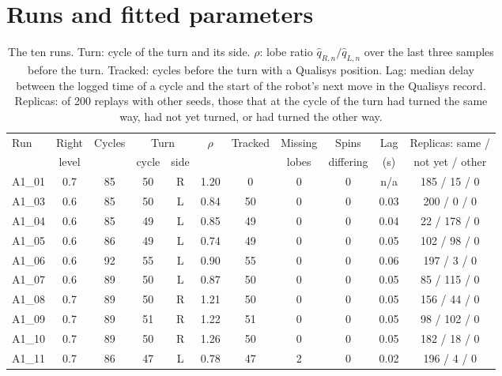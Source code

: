 \documentclass[11pt,a4paper]{article}
\newcommand{\qL}{\hat q_{L,n}}
\newcommand{\qR}{\hat q_{R,n}}
\begin{document}
\appendix
\section{Runs and fitted parameters}

\begin{table}[H]
\centering\small
\caption{The ten runs. Turn: cycle of the turn and its side. $\rho$: lobe ratio $\qR/\qL$ over the last three
samples before the turn. Tracked: cycles before the turn with a Qualisys position. Lag: median delay between
the logged time of a cycle and the start of the robot's next move in the Qualisys record. Replicas: of 200
replays with other seeds, those that at the cycle of the turn had turned the same way, had not yet turned, or
had turned the other way.}
\label{tab:runs}
\setlength{\tabcolsep}{4.2pt}
\begin{tabular}{@{}l c c c c c c c c c c@{}}
\toprule
Run & Right & Cycles & \multicolumn{2}{c}{Turn} & $\rho$ & Tracked & Missing & Spins & Lag & Replicas: same /\\
 & level & & cycle & side & & & lobes & differing & (s) & not yet / other\\
\midrule
A1\_01 & 0.7 & 85 & 50 & R & 1.20 & 0 & 0 & 0 & n/a & 185 / 15 / 0\\
A1\_03 & 0.6 & 85 & 50 & L & 0.84 & 50 & 0 & 0 & 0.03 & 200 / 0 / 0\\
A1\_04 & 0.6 & 85 & 49 & L & 0.85 & 49 & 0 & 0 & 0.04 & 22 / 178 / 0\\
A1\_05 & 0.6 & 86 & 49 & L & 0.74 & 49 & 0 & 0 & 0.05 & 102 / 98 / 0\\
A1\_06 & 0.6 & 92 & 55 & L & 0.90 & 55 & 0 & 0 & 0.06 & 197 / 3 / 0\\
A1\_07 & 0.6 & 89 & 50 & L & 0.87 & 50 & 0 & 0 & 0.05 & 85 / 115 / 0\\
A1\_08 & 0.7 & 89 & 50 & R & 1.21 & 50 & 0 & 0 & 0.05 & 156 / 44 / 0\\
A1\_09 & 0.7 & 89 & 51 & R & 1.22 & 51 & 0 & 0 & 0.05 & 98 / 102 / 0\\
A1\_10 & 0.7 & 89 & 50 & R & 1.26 & 50 & 0 & 0 & 0.05 & 182 / 18 / 0\\
A1\_11 & 0.7 & 86 & 47 & L & 0.78 & 47 & 2 & 0 & 0.02 & 196 / 4 / 0\\
\bottomrule
\end{tabular}
\end{table}
\end{document}
